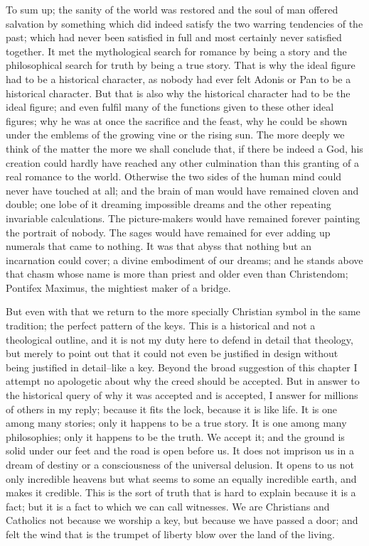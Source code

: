 To sum up; the sanity of the world was restored and the soul of man offered salvation by something which did indeed satisfy the two warring tendencies of the past; which had never been satisfied in full and most certainly never satisfied together. It met the mythological search for romance by being a story and the philosophical search for truth by being a true story. That is why the ideal figure had to be a historical character, as nobody had ever felt Adonis or Pan to be a historical character. But that is also why the historical character had to be the ideal figure; and even fulfil many of the functions given to these other ideal figures; why he was at once the sacrifice and the feast, why he could be shown under the emblems of the growing vine or the rising sun. The more deeply we think of the matter the more we shall conclude that, if there be indeed a God, his creation could hardly have reached any other culmination than this granting of a real romance to the world. Otherwise the two sides of the human mind could never have touched at all; and the brain of man would have remained cloven and double; one lobe of it dreaming impossible dreams and the other repeating invariable calculations. The picture-makers would have remained forever painting the portrait of nobody. The sages would have remained for ever adding up numerals that came to nothing. It was that abyss that nothing but an incarnation could cover; a divine embodiment of our dreams; and he stands above that chasm whose name is more than priest and older even than Christendom; Pontifex Maximus, the mightiest maker of a bridge.

But even with that we return to the more specially Christian symbol in the same tradition; the perfect pattern of the keys. This is a historical and not a theological outline, and it is not my duty here to defend in detail that theology, but merely to point out that it could not even be justified in design without being justified in detail--like a key. Beyond the broad suggestion of this chapter I attempt no apologetic about why the creed should be accepted. But in answer to the historical query of why it was accepted and is accepted, I answer for millions of others in my reply; because it fits the lock, because it is like life. It is one among many stories; only it happens to be a true story. It is one among many philosophies; only it happens to be the truth. We accept it; and the ground is solid under our feet and the road is open before us. It does not imprison us in a dream of destiny or a consciousness of the universal delusion. It opens to us not only incredible heavens but what seems to some an equally incredible earth, and makes it credible. This is the sort of truth that is hard to explain because it is a fact; but it is a fact to which we can call witnesses. We are Christians and Catholics not because we worship a key, but because we have passed a door; and felt the wind that is the trumpet of liberty blow over the land of the living.

